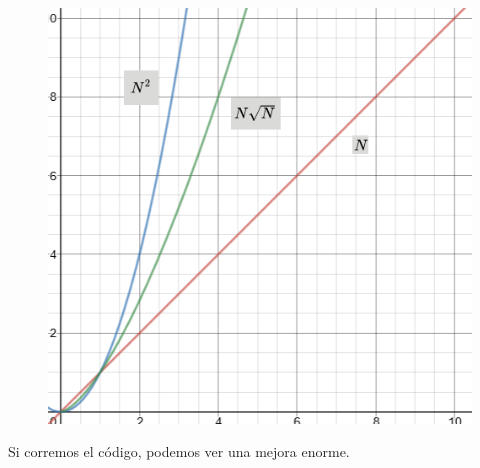\documentclass{article}
\begin{document}
\begin{figure}[H]
    \centering
    \includegraphics[width=0.3\paperwidth]{nsquaredn}
\end{figure}

Si corremos el código, podemos ver una mejora enorme.
\end{document}
